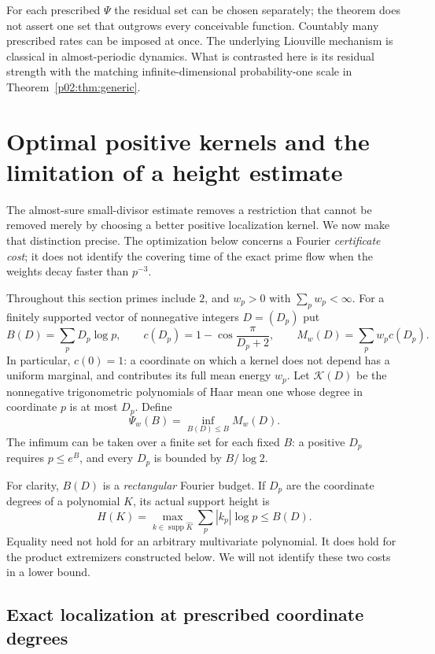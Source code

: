 \documentclass[11pt,letterpaper]{article}
\theoremstyle{definition}
\theoremstyle{remark}
\newcommand{\1}{\mathbf 1}
\begin{document}
For each prescribed $\Psi$ the residual set can be chosen separately;
the theorem does not assert one set that outgrows every conceivable
function. Countably many prescribed rates can be imposed at once.
The underlying Liouville mechanism is classical in almost-periodic
dynamics. What is contrasted here is its residual strength with the
matching infinite-dimensional probability-one scale in
Theorem~\ref{p02:thm:generic}.


\section{Optimal positive kernels and the limitation of a height estimate}
\label{p02:sec:barrier}

The almost-sure small-divisor estimate removes a restriction that cannot be
removed merely by choosing a better positive localization kernel. We now
make that distinction precise. The optimization below concerns a Fourier
\emph{certificate cost}; it does not identify the covering time of the exact
prime flow when the weights decay faster than $p^{-3}$.

Throughout this section primes include $2$, and $w_p>0$ with
$\sum_p w_p<\infty$. For a finitely supported vector of nonnegative integers
$D=(D_p)$ put
\[
 B(D)=\sum_pD_p\log p,\qquad
 c(D_p)=1-\cos\frac{\pi}{D_p+2},\qquad
 M_w(D)=\sum_pw_pc(D_p).
\]
In particular, $c(0)=1$: a coordinate on which a kernel does not depend
has a uniform marginal, and contributes its full mean energy $w_p$.
Let $\mathcal K(D)$ be the nonnegative trigonometric polynomials of Haar
mean one whose degree in coordinate $p$ is at most $D_p$. Define
\begin{equation}\label{p02:eq:barrier-Psi}
 \Psi_w(B)=\inf_{B(D)\le B}M_w(D).
\end{equation}
The infimum can be taken over a finite set for each fixed $B$: a positive
$D_p$ requires $p\le e^B$, and every $D_p$ is bounded by $B/\log2$.

For clarity, $B(D)$ is a \emph{rectangular} Fourier budget. If $D_p$ are
the coordinate degrees of a polynomial $K$, its actual support height is
\[
 H(K)=\max_{k\in\operatorname{supp}\widehat K}
             \sum_p|k_p|\log p\le B(D).
\]
Equality need not hold for an arbitrary multivariate polynomial. It does
hold for the product extremizers constructed below. We will not identify
these two costs in a lower bound.

\subsection{Exact localization at prescribed coordinate degrees}
\end{document}
